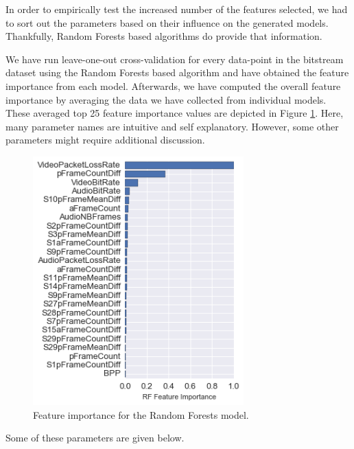 \documentclass[journal]{IEEEtran}
\begin{document}
In order to empirically test the increased number of the features selected, we had to sort out the parameters based on their influence on the generated models. Thankfully, Random Forests based algorithms do provide that information.

We have run leave-one-out cross-validation for every data-point in the bitstream dataset using the Random Forests based algorithm and have obtained the feature importance from each model. Afterwards, we have computed the overall feature importance by averaging the data we have collected from individual models. These averaged top 25 feature importance values are depicted in Figure \ref{fig:RFFeatures}. Here, many parameter names are intuitive and self explanatory. However, some other parameters might require additional discussion. 

\begin{figure}[ht!]
\includegraphics[width=3.2in]{./rffi.png}
\caption{Feature importance for the Random Forests model.}
\label{fig:RFFeatures}
\vspace{-0.2cm}
\end{figure}

Some of these parameters are given below.
\end{document}
